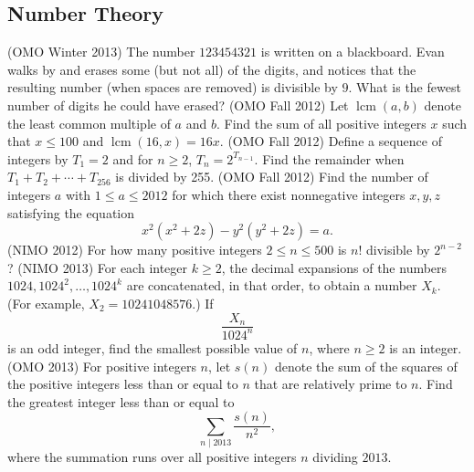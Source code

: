 \documentclass[11pt]{scrartcl}
\begin{document}
\subsection{Number Theory}
\begin{enumerate}[\bfseries {N}1.]
  \ii %
    (OMO Winter 2013) The number $123454321$ is written on a blackboard. Evan walks by and erases some (but not all) of the digits, and notices that the resulting number (when spaces are removed) is divisible by $9$. What is the fewest number of digits he could have erased?
  \ii %
    (OMO Fall 2012) Let $\operatorname{lcm} (a,b)$ denote the least common multiple of $a$ and $b$. Find the sum of all positive integers $x$ such that $x\le 100$ and $\operatorname{lcm}(16,x) = 16x$.
  \ii %
    (OMO Fall 2012)  Define a sequence of integers by $T_1 = 2$ and for $n\ge2$, $T_n = 2^{T_{n-1}}$. Find the remainder when $T_1 + T_2 + \cdots + T_{256}$ is divided by 255.
  \ii %
    (OMO Fall 2012) Find the number of integers $a$ with $1\le a\le 2012$ for which there exist nonnegative integers $x,y,z$ satisfying the equation \[x^2(x^2+2z) - y^2(y^2+2z)=a.\]
  \ii %
    (NIMO 2012) For how many positive integers $2 \le n \le 500$ is $n!$ divisible by $2^{n-2}$?
  \ii %
    (NIMO 2013) For each integer $k\ge2$, the decimal expansions of the numbers $1024,1024^2,\dots,1024^k$ are concatenated, in that order, to obtain a number $X_k$.  (For example, $X_2 = 10241048576$.)  If \[ \frac{X_n}{1024^n} \] is an odd integer, find the smallest possible value of $n$, where $n\ge2$ is an integer.
  \ii %
    (OMO 2013) For positive integers $n$, let $s(n)$ denote the sum of the squares of the positive integers less than or equal to $n$ that are relatively prime to $n$. Find the greatest integer less than or equal to \[ \sum_{n\mid 2013} \frac{s(n)}{n^2}, \] where the summation runs over all positive integers $n$ dividing $2013$.
\end{enumerate}
\end{document}
